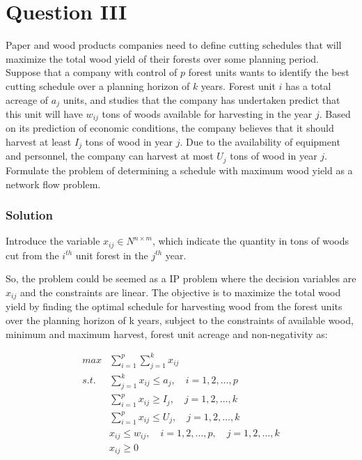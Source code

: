 \documentclass[11pt]{article}
\begin{document}
    \hypertarget{question-iii}{%
\section{Question III}\label{question-iii}}

Paper and wood products companies need to define cutting schedules that
will maximize the total wood yield of their forests over some planning
period. Suppose that a company with control of \(p\) forest units wants
to identify the best cutting schedule over a planning horizon of \(k\)
years. Forest unit \(i\) has a total acreage of \(a_j\) units, and
studies that the company has undertaken predict that this unit will have
\(w_{ij}\) tons of woods available for harvesting in the year \(j\).
Based on its prediction of economic conditions, the company believes
that it should harvest at least \(I_j\) tons of wood in year \(j\). Due
to the availability of equipment and personnel, the company can harvest
at most \(U_j\) tons of wood in year \(j\). Formulate the problem of
determining a schedule with maximum wood yield as a network flow
problem.

\hypertarget{solution}{%
\subsubsection{Solution}\label{solution}}

Introduce the variable \(x_{ij} \in N^{n\times m}\), which indicate the
quantity in tons of woods cut from the \(i^{th}\) unit forest in the
\(j^{th}\) year.

So, the problem could be seemed as a IP problem where the decision
variables are \(x_{ij}\) and the constraints are linear. The objective
is to maximize the total wood yield by finding the optimal schedule for
harvesting wood from the forest units over the planning horizon of k
years, subject to the constraints of available wood, minimum and maximum
harvest, forest unit acreage and non-negativity as:

\[ \begin{align*} max &\sum_{i=1}^{p}\sum_{j=1}^{k} x_{ij} \\
s.t. &\sum_{j=1}^{k} x_{ij} \leq a_j, \quad  i = {1,2, \dots ,p}
\\ &\sum_{i=1}^{p} x_{ij} \geq I_j, \quad  j = {1,2, \dots ,k}
\\ &\sum_{i=1}^{p} x_{ij} \leq U_j, \quad  j = {1,2, \dots ,k}
\\ &x_{ij} \leq w_{ij}, \quad i = {1,2, \dots ,p},\quad j = {1,2, \dots ,k}
\\ &x_{ij} \geq 0  \end{align*}\]
\end{document}
